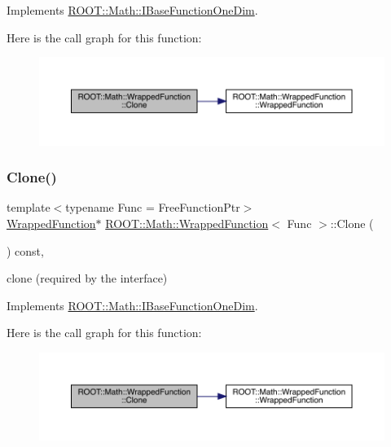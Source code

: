 Implements \mbox{\hyperlink{classROOT_1_1Math_1_1IBaseFunctionOneDim_a656dbb4dfc43e8d1566442bfb1a717fd}{R\+O\+O\+T\+::\+Math\+::\+I\+Base\+Function\+One\+Dim}}.

Here is the call graph for this function\+:
\nopagebreak
\begin{figure}[H]
\begin{center}
\leavevmode
\includegraphics[width=350pt]{de/d34/classROOT_1_1Math_1_1WrappedFunction_a4ec89f0c717b0fc228ebe7d71e14b1ee_cgraph}
\end{center}
\end{figure}
\mbox{\label{classROOT_1_1Math_1_1WrappedFunction_a4ec89f0c717b0fc228ebe7d71e14b1ee}} 
\subsubsection{\texorpdfstring{Clone()}{Clone()}\hspace{0.1cm}{\footnotesize\ttfamily [2/2]}}
{\footnotesize\ttfamily template$<$typename Func  = Free\+Function\+Ptr$>$ \\
\mbox{\hyperlink{classROOT_1_1Math_1_1WrappedFunction}{Wrapped\+Function}}$\ast$ \mbox{\hyperlink{classROOT_1_1Math_1_1WrappedFunction}{R\+O\+O\+T\+::\+Math\+::\+Wrapped\+Function}}$<$ Func $>$\+::Clone (\begin{DoxyParamCaption}{ }\end{DoxyParamCaption}) const\hspace{0.3cm}{\ttfamily [inline]}, {\ttfamily [virtual]}}



clone (required by the interface) 



Implements \mbox{\hyperlink{classROOT_1_1Math_1_1IBaseFunctionOneDim_a656dbb4dfc43e8d1566442bfb1a717fd}{R\+O\+O\+T\+::\+Math\+::\+I\+Base\+Function\+One\+Dim}}.

Here is the call graph for this function\+:
\nopagebreak
\begin{figure}[H]
\begin{center}
\leavevmode
\includegraphics[width=350pt]{de/d34/classROOT_1_1Math_1_1WrappedFunction_a4ec89f0c717b0fc228ebe7d71e14b1ee_cgraph}
\end{center}
\end{figure}


